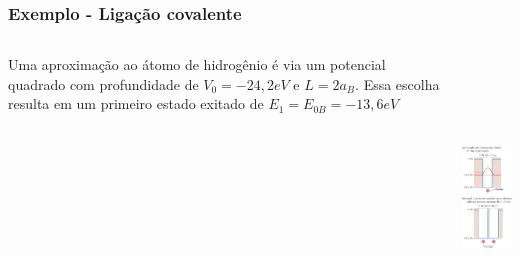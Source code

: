 \documentclass[12pt,brazil,table]{beamer}
\begin{document}
  

\begin{frame}
  \frametitle{Exemplo - Ligação covalente\\}
  
  \fontsize{9pt}{11pt}\selectfont
  \vspace*{-1.5cm}
  \begin{columns}
    
    Uma aproximação ao átomo de hidrogênio é via um potencial quadrado com profundidade de $V_0=-24,2eV$ e $L=2a_B$. Essa escolha resulta em um primeiro estado exitado de $E_1=E_{0B}=-13,6eV$
    
    
    {\centering \vspace*{0.5cm}\includegraphics[height=7.5cm]{figuras/fig30}}
    
    \fontsize{6pt}{11pt}\selectfont
      
  \end{columns}
   

\end{frame}
  
\end{document}
